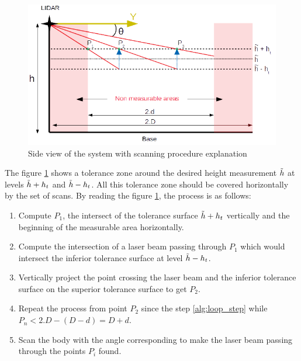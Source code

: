 \documentclass{article}
\begin{document}
\begin{figure}[H]
    \centering
    \includegraphics[width=\textwidth]{images/schematic_scan_procedure.png}
    \caption{Side view of the system with scanning procedure explanation}
    \label{fig:sch_scanning_procedure}
\end{figure}

The figure \ref{fig:sch_scanning_procedure} shows a tolerance zone around the desired height measurement $\Tilde{h}$ at levels $\Tilde{h}+h_t$ and $\Tilde{h}-h_t$. All this tolerance zone should be covered horizontally by the set of scans. By reading the figure \ref{fig:sch_scanning_procedure}, the process is as follows:

\begin{enumerate}
    \item Compute $P_1$, the intersect of the tolerance surface $\Tilde{h}+h_t$ vertically and the beginning of the measurable area horizontally.
    \item \label{alg:loop_step} Compute the intersection of a laser beam passing through $P_1$ which would intersect the inferior tolerance surface at level $\Tilde{h}-h_t$.
    \item Vertically project the point crossing the laser beam and the inferior tolerance surface on the superior tolerance surface to get $P_2$.
    \item Repeat the process from point $P_2$ since the step \ref{alg:loop_step} while $P_n < 2.D - (D-d) = D+d$.
    \item Scan the body with the angle corresponding to make the laser beam passing through the points $P_i$ found.
\end{enumerate}
\end{document}
